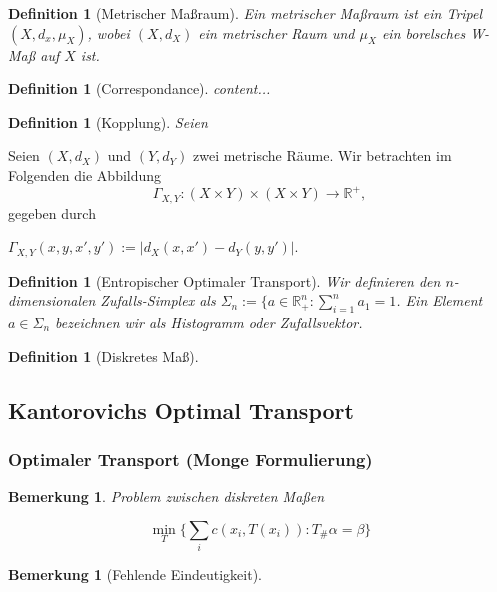 \documentclass[11pt,a4paper]{article}
\def\emph#1{\textit{#1}}
\newtheorem{definition}[theorem]{Definition}
\newtheorem{remark}[theorem]{Bemerkung}
\numberwithin{equation}{section}
\begin{document}
	
	\begin{definition}[Metrischer Maßraum]
		Ein \emph{metrischer Maßraum} ist ein Tripel $(X,d_x,\mu_X)$, wobei $(X,d_X)$ ein metrischer Raum und $\mu_X$ ein borelsches W-Maß auf $X$ ist.
	\end{definition}
	
	\begin{definition}[Correspondance]
		content...
	\end{definition}
	
	\begin{definition}[Kopplung]
		Seien 
	\end{definition}
	
	Seien $(X,d_X)$ und $(Y,d_Y)$ zwei metrische Räume. Wir betrachten im Folgenden die Abbildung
	\begin{equation}
	\Gamma_{X,Y}: (X\times Y) \times (X \times Y) \to \mathbb{R^{+}},
	\end{equation}
	gegeben durch
	
	$\Gamma_{X,Y}(x,y,x',y'):= |d_X(x,x') - d_Y(y,y')|$.
	
	
	\begin{definition}[Entropischer Optimaler Transport]
		Wir definieren den $n$-dimensionalen Zufalls-Simplex als $\Sigma_n := \lbrace a \in \mathbb{R}_+^n: \sum_{i=1}^{n}{a_1} = 1$. Ein Element $a \in \Sigma_n$ bezeichnen wir als Histogramm oder Zufallsvektor.
		
	\end{definition}
	
	\begin{definition}[Diskretes Maß]
		
	\end{definition}

	\subsection{Kantorovichs Optimal Transport}
	\subsubsection{Optimaler Transport (Monge Formulierung)}
	\begin{remark}
		Problem zwischen diskreten Maßen
		
		\begin{equation}
		\min_T \lbrace \sum_i {c(x_i, T(x_i))} : T_\#\alpha = \beta \rbrace
		\end{equation}
	\end{remark}
	\begin{remark}[Fehlende Eindeutigkeit]
	
	
	\end{remark}
	
\end{document}
